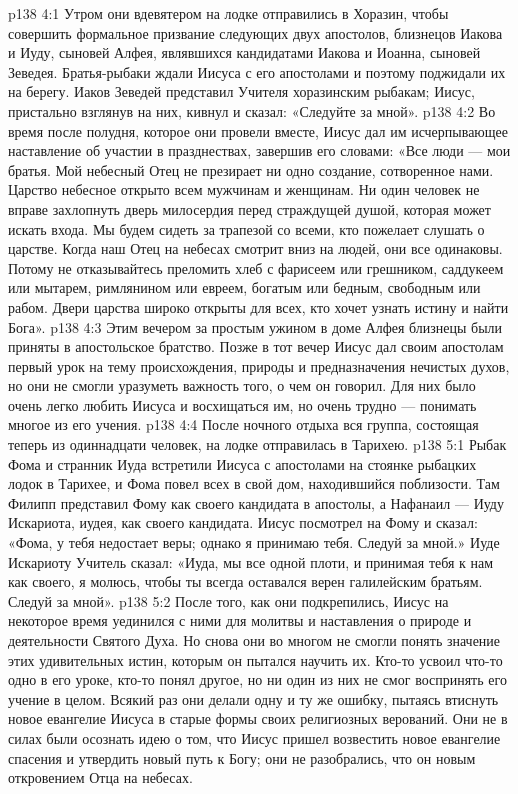 \vs p138 4:1 Утром они вдевятером на лодке отправились в Хоразин, чтобы совершить формальное призвание следующих двух апостолов, близнецов Иакова и Иуду, сыновей Алфея, являвшихся кандидатами Иакова и Иоанна, сыновей Зеведея. Братья\hyp{}рыбаки ждали Иисуса с его апостолами и поэтому поджидали их на берегу. Иаков Зеведей представил Учителя хоразинским рыбакам; Иисус, пристально взглянув на них, кивнул и сказал: «Следуйте за мной».
\vs p138 4:2 \pc Во время после полудня, которое они провели вместе, Иисус дал им исчерпывающее наставление об участии в празднествах, завершив его словами: «Все люди --- мои братья. Мой небесный Отец не презирает ни одно создание, сотворенное нами. Царство небесное открыто всем мужчинам и женщинам. Ни один человек не вправе захлопнуть дверь милосердия перед страждущей душой, которая может искать входа. Мы будем сидеть за трапезой со всеми, кто пожелает слушать о царстве. Когда наш Отец на небесах смотрит вниз на людей, они все одинаковы. Потому не отказывайтесь преломить хлеб с фарисеем или грешником, саддукеем или мытарем, римлянином или евреем, богатым или бедным, свободным или рабом. Двери царства широко открыты для всех, кто хочет узнать истину и найти Бога».
\vs p138 4:3 \pc Этим вечером за простым ужином в доме Алфея близнецы были приняты в апостольское братство. Позже в тот вечер Иисус дал своим апостолам первый урок на тему происхождения, природы и предназначения нечистых духов, но они не смогли уразуметь важность того, о чем он говорил. Для них было очень легко любить Иисуса и восхищаться им, но очень трудно --- понимать многое из его учения.
\vs p138 4:4 После ночного отдыха вся группа, состоящая теперь из одиннадцати человек, на лодке отправилась в Тарихею.
\vs p138 5:1 Рыбак Фома и странник Иуда встретили Иисуса с апостолами на стоянке рыбацких лодок в Тарихее, и Фома повел всех в свой дом, находившийся поблизости. Там Филипп представил Фому как своего кандидата в апостолы, а Нафанаил --- Иуду Искариота, иудея, как своего кандидата. Иисус посмотрел на Фому и сказал: «Фома, у тебя недостает веры; однако я принимаю тебя. Следуй за мной.» Иуде Искариоту Учитель сказал: «Иуда, мы все одной плоти, и принимая тебя к нам как своего, я молюсь, чтобы ты всегда оставался верен галилейским братьям. Следуй за мной».
\vs p138 5:2 \pc После того, как они подкрепились, Иисус на некоторое время уединился с ними для молитвы и наставления о природе и деятельности Святого Духа. Но снова они во многом не смогли понять значение этих удивительных истин, которым он пытался научить их. Кто\hyp{}то усвоил что\hyp{}то одно в его уроке, кто\hyp{}то понял другое, но ни один из них не смог воспринять его учение в целом. Всякий раз они делали одну и ту же ошибку, пытаясь втиснуть новое евангелие Иисуса в старые формы своих религиозных верований. Они не в силах были осознать идею о том, что Иисус пришел возвестить новое евангелие спасения и утвердить новый путь к Богу; они не разобрались, что он  новым откровением Отца на небесах.
